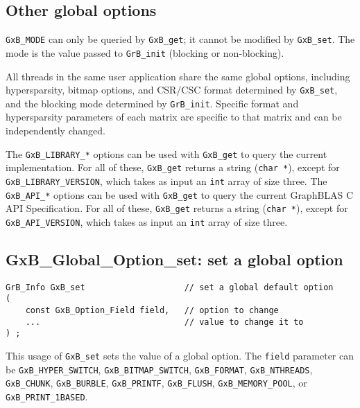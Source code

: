 \documentclass[12pt]{article}
\begin{document}
\subsection{Other global options}

\verb'GxB_MODE' can only be
queried by \verb'GxB_get'; it cannot be modified by \verb'GxB_set'.  The mode
is the value passed to \verb'GrB_init' (blocking or non-blocking).

All threads in the same user application share the same global options,
including hypersparsity, bitmap options, and CSR/CSC format determined by
\verb'GxB_set', and the blocking mode determined by \verb'GrB_init'.
Specific format and hypersparsity parameters of each matrix are specific to
that matrix and can be independently changed.

The \verb'GxB_LIBRARY_*' options can be used with \verb'GxB_get' to query the
current implementation.  For all of these, \verb'GxB_get' returns a string
(\verb'char *'), except for \verb'GxB_LIBRARY_VERSION', which takes as input an
\verb'int' array of size three.  The \verb'GxB_API_*' options can be used with
\verb'GxB_get' to query the current GraphBLAS C API Specification.  For all of
these, \verb'GxB_get' returns a string (\verb'char *'), except for
\verb'GxB_API_VERSION', which takes as input an \verb'int' array of size three.  

\subsection{{\sf GxB\_Global\_Option\_set:} set a global option}

\begin{mdframed}[userdefinedwidth=6in]
{\footnotesize
\begin{verbatim}
GrB_Info GxB_set                    // set a global default option
(
    const GxB_Option_Field field,   // option to change
    ...                             // value to change it to
) ;
\end{verbatim} } \end{mdframed}

This usage of \verb'GxB_set' sets the value of a global option.
The \verb'field' parameter can be
\verb'GxB_HYPER_SWITCH',
\verb'GxB_BITMAP_SWITCH',
\verb'GxB_FORMAT',
\verb'GxB_NTHREADS',
\verb'GxB_CHUNK',
\verb'GxB_BURBLE',
\verb'GxB_PRINTF',
\verb'GxB_FLUSH',
\verb'GxB_MEMORY_POOL',
or
\verb'GxB_PRINT_1BASED'.
\end{document}
